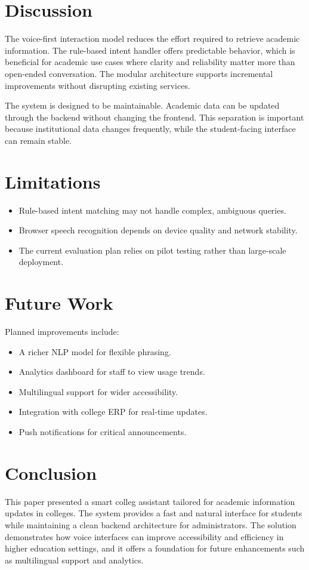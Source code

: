 ﻿\documentclass[conference]{IEEEtran}
\begin{document}
\section{Discussion}
The voice-first interaction model reduces the effort required to retrieve academic information. The rule-based intent handler offers predictable behavior, which is beneficial for academic use cases where clarity and reliability matter more than open-ended conversation. The modular architecture supports incremental improvements without disrupting existing services.

The system is designed to be maintainable. Academic data can be updated through the backend without changing the frontend. This separation is important because institutional data changes frequently, while the student-facing interface can remain stable.

\section{Limitations}
\begin{itemize}[leftmargin=*]
\item Rule-based intent matching may not handle complex, ambiguous queries.
\item Browser speech recognition depends on device quality and network stability.
\item The current evaluation plan relies on pilot testing rather than large-scale deployment.
\end{itemize}

\section{Future Work}
Planned improvements include:
\begin{itemize}[leftmargin=*]
\item A richer NLP model for flexible phrasing.
\item Analytics dashboard for staff to view usage trends.
\item Multilingual support for wider accessibility.
\item Integration with college ERP for real-time updates.
\item Push notifications for critical announcements.
\end{itemize}

\section{Conclusion}
This paper presented a smart colleg assistant tailored for academic information updates in colleges. The system provides a fast and natural interface for students while maintaining a clean backend architecture for administrators. The solution demonstrates how voice interfaces can improve accessibility and efficiency in higher education settings, and it offers a foundation for future enhancements such as multilingual support and analytics.
\end{document}
